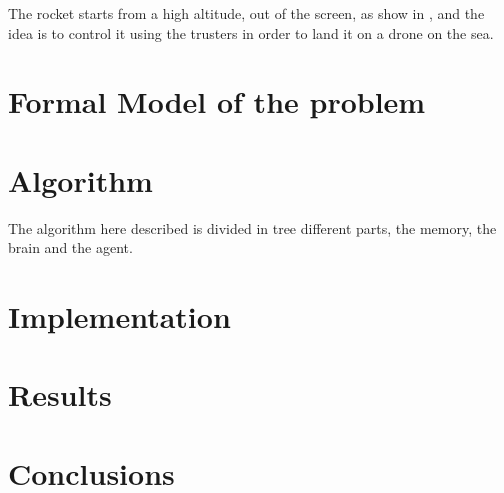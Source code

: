 \documentclass{article}
\begin{document}
The rocket starts from a high altitude, out of the screen, as show in \pageref{fig:fig1}, and the idea is to control it using the trusters in order to land it on a drone on the sea.

\section{Formal Model of the problem}

\section{Algorithm}
The algorithm here described is divided in tree different parts, the memory, the brain and the agent.

\section{Implementation}

\section{Results}

\section{Conclusions}
\end{document}
